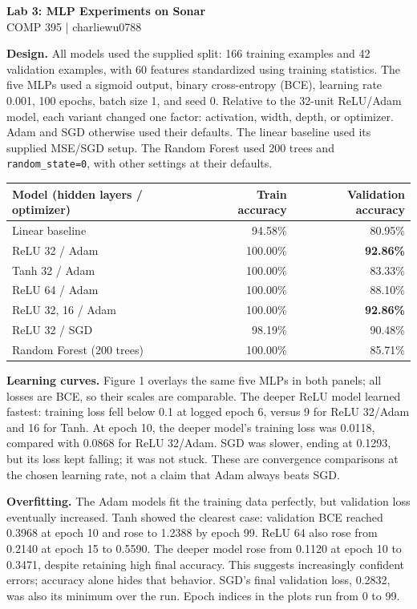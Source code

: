 \documentclass[10pt]{article}
\begin{document}
\begin{center}
{\Large\bfseries Lab 3: MLP Experiments on Sonar}\\[3pt]
COMP 395 \quad | \quad charliewu0788
\end{center}

\textbf{Design.} All models used the supplied split: 166 training examples and 42 validation examples, with 60 features standardized using training statistics. The five MLPs used a sigmoid output, binary cross-entropy (BCE), learning rate 0.001, 100 epochs, batch size 1, and seed 0. Relative to the 32-unit ReLU/Adam model, each variant changed one factor: activation, width, depth, or optimizer. Adam and SGD otherwise used their defaults. The linear baseline used its supplied MSE/SGD setup. The Random Forest used 200 trees and \texttt{random\_state=0}, with other settings at their defaults.

\begin{center}
\small
\begin{tabular}{lrr}
\toprule
Model (hidden layers / optimizer) & Train accuracy & Validation accuracy \\
\midrule
Linear baseline & 94.58\% & 80.95\% \\
ReLU 32 / Adam & 100.00\% & \textbf{92.86\%} \\
Tanh 32 / Adam & 100.00\% & 83.33\% \\
ReLU 64 / Adam & 100.00\% & 88.10\% \\
ReLU 32, 16 / Adam & 100.00\% & \textbf{92.86\%} \\
ReLU 32 / SGD & 98.19\% & 90.48\% \\
Random Forest (200 trees) & 100.00\% & 85.71\% \\
\bottomrule
\end{tabular}
\end{center}

\textbf{Learning curves.} Figure 1 overlays the same five MLPs in both panels; all losses are BCE, so their scales are comparable. The deeper ReLU model learned fastest: training loss fell below 0.1 at logged epoch 6, versus 9 for ReLU 32/Adam and 16 for Tanh. At epoch 10, the deeper model's training loss was 0.0118, compared with 0.0868 for ReLU 32/Adam. SGD was slower, ending at 0.1293, but its loss kept falling; it was not stuck. These are convergence comparisons at the chosen learning rate, not a claim that Adam always beats SGD.

\textbf{Overfitting.} The Adam models fit the training data perfectly, but validation loss eventually increased. Tanh showed the clearest case: validation BCE reached 0.3968 at epoch 10 and rose to 1.2388 by epoch 99. ReLU 64 also rose from 0.2140 at epoch 15 to 0.5590. The deeper model rose from 0.1120 at epoch 10 to 0.3471, despite retaining high final accuracy. This suggests increasingly confident errors; accuracy alone hides that behavior. SGD's final validation loss, 0.2832, was also its minimum over the run. Epoch indices in the plots run from 0 to 99.
\end{document}
